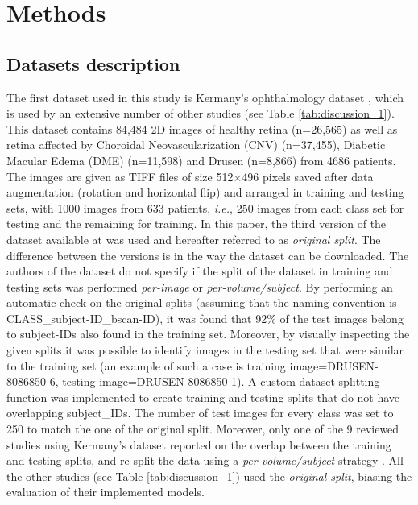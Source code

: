 \documentclass[fleqn,10pt]{wlscirep}
\begin{document}
\section*{Methods}
\subsection*{Datasets description}
The first dataset used in this study is Kermany's ophthalmology dataset \cite{kermany2018large, kermany2018identifying}, which is used by an extensive number of other studies (see Table \ref{tab:discussion_1}). This dataset contains 84,484 2D images of healthy retina (n=26,565) as well as retina affected by Choroidal Neovascularization (CNV) (n=37,455), Diabetic Macular Edema (DME) (n=11,598) and Drusen (n=8,866) from 4686 patients. The images are given as TIFF files of size 512$\times$496 pixels saved after data augmentation (rotation and horizontal flip) and arranged in training and testing sets, with 1000 images from 633 patients, \textit{i.e.}, 250 images from each class set for testing and the remaining for training. In this paper, the third version of the dataset available at \cite{kermany2018large} was used and hereafter referred to as \textit{original split}. The difference between the versions is in the way the dataset can be downloaded. The authors of the dataset \cite{kermany2018large} do not specify if the split of the dataset in training and testing sets was performed \textit{per-image} or \textit{per-volume/subject}. By performing an automatic check on the original splits (assuming that the naming convention is CLASS\_subject-ID\_bscan-ID), it was found that 92\% of the test images belong to subject-IDs also found in the training set. Moreover, by visually inspecting the given splits it was possible to identify images in the testing set that were similar to the training set (an example of such a case is training image=DRUSEN-8086850-6, testing image=DRUSEN-8086850-1).
A custom dataset splitting function was implemented to create training and testing splits that do not have overlapping subject\_IDs. The number of test images for every class was set to 250 to match the one of the original split. Moreover, only one of the 9 reviewed studies using Kermany’s dataset reported on the overlap between the training and testing splits, and re-split the data using a \textit{per-volume/subject} strategy \cite{chetoui2020deep}. All the other studies (see Table \ref{tab:discussion_1}) used the \textit{original split}, biasing the evaluation of their implemented models. 
\end{document}
